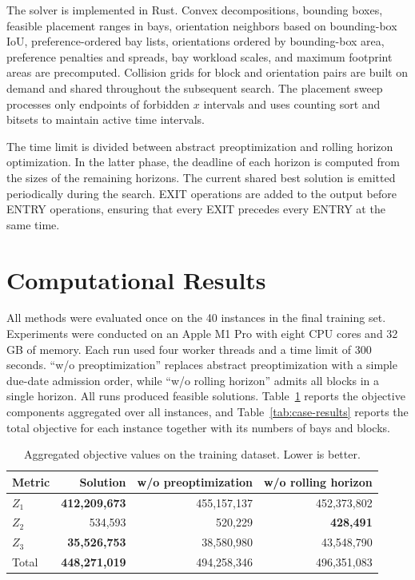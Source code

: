 \documentclass[runningheads]{llncs}
\begin{document}
The solver is implemented in Rust. Convex decompositions, bounding boxes, feasible placement ranges in bays, orientation neighbors based on bounding-box IoU, preference-ordered bay lists, orientations ordered by bounding-box area, preference penalties and spreads, bay workload scales, and maximum footprint areas are precomputed. Collision grids for block and orientation pairs are built on demand and shared throughout the subsequent search. The placement sweep processes only endpoints of forbidden $x$ intervals and uses counting sort and bitsets to maintain active time intervals.

The time limit is divided between abstract preoptimization and rolling horizon optimization. In the latter phase, the deadline of each horizon is computed from the sizes of the remaining horizons. The current shared best solution is emitted periodically during the search. EXIT operations are added to the output before ENTRY operations, ensuring that every EXIT precedes every ENTRY at the same time.


\section{Computational Results}

All methods were evaluated once on the 40 instances in the final training
set. Experiments were conducted on an Apple M1 Pro with eight CPU cores and
32 GB of memory. Each run used four worker threads and a
time limit of 300 seconds. ``w/o preoptimization'' replaces abstract preoptimization with a
simple due-date admission order, while ``w/o rolling horizon'' admits all
blocks in a single horizon.  All runs produced feasible solutions.
Table~\ref{tab:aggregate-results} reports the objective components aggregated
over all instances, and Table~\ref{tab:case-results} reports the total
objective for each instance together with its numbers of bays and blocks.

\begin{table}[H]
  \centering
  \caption{Aggregated objective values on the training dataset. Lower is better.}
  \label{tab:aggregate-results}
  \begin{tabular}{lrrr}
    \hline
    Metric & Solution & w/o preoptimization & w/o rolling horizon \\
    \hline
    $Z_1$ & \textbf{412,209,673} & 455,157,137 & 452,373,802 \\
    $Z_2$ & 534,593 & 520,229 & \textbf{428,491} \\
    $Z_3$ & \textbf{35,526,753} & 38,580,980 & 43,548,790 \\
    Total & \textbf{448,271,019} & 494,258,346 & 496,351,083 \\
    \hline
  \end{tabular}
\end{table}
\end{document}
